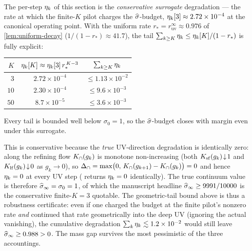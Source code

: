 \begin{remark}
\label{rmk:explicit-tail}
The per-step $\eta_k$ of this section is the \emph{conservative
surrogate} degradation --- the rate at which the finite-$K$ pilot
charges the $\widehat{\sigma}$-budget, $\eta_k[3] \approx 2.72 \times 10^{-4}$ at
the canonical operating point.  With the uniform rate
$r_\ast = r_{\mathrm{uv}}^\infty \approx 0.976$ of
\cref{lem:uniform-decay} ($1/(1-r_\ast) \approx 41.7$), the tail
$\sum_{k \ge K}\eta_k \le \eta_k[K]/(1-r_\ast)$ is fully explicit:
\begin{center}
\renewcommand{\arraystretch}{1.2}
\begin{tabular}{rcc}
\toprule
$K$ & $\eta_k[K] \approx \eta_k[3]\,r_\ast^{\,K-3}$ & $\sum_{k \ge K}\eta_k$ \\
\midrule
$3$  & $2.72 \times 10^{-4}$ & $\le 1.13 \times 10^{-2}$ \\
$10$ & $2.30 \times 10^{-4}$ & $\le 9.6 \times 10^{-3}$ \\
$50$ & $8.7 \times 10^{-5}$  & $\le 3.6 \times 10^{-3}$ \\
\bottomrule
\end{tabular}
\end{center}
Every tail is bounded well below $\sigma_0 = 1$, so the
$\widehat{\sigma}$-budget closes with margin even under this surrogate.

This is conservative because the \emph{true} UV-direction degradation
is identically zero: along the refining flow $K_{\cap}(g_k)$ is monotone
non-increasing (both $K_{\mathrm{sf}}(g_k)\!\downarrow\!1$ and
$K_{\mathrm{lf}}(g_k)\!\downarrow\!0$ as $g_k \to 0$), so
$\Delta_{\cap} = \max\bigl(0,\,K_{\cap}(g_{k+1}) - K_{\cap}(g_k)\bigr) = 0$ and hence
$\eta_k = 0$ at every UV step (
returns $\eta_k = 0$ identically).  The true continuum value is
therefore $\widehat{\sigma}_\infty = \sigma_0 = 1$, of which the manuscript headline
$\widehat{\sigma}_\infty \ge 9991/10000$ is the conservative finite-$K = 3$ quotable.
The geometric-tail bound above is thus a robustness certificate: even
if one charged the budget at the finite pilot's nonzero rate
\emph{and} continued that rate geometrically into the deep UV
(ignoring the actual vanishing), the cumulative degradation
$\sum_k \eta_k \lesssim 1.2 \times 10^{-2}$ would still leave
$\widehat{\sigma}_\infty \ge 0.988 > 0$.  The mass gap survives the most pessimistic
of the three accountings.
\end{remark}

